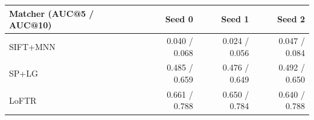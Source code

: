 \begin{tabular}{lrrr}
\toprule
Matcher (AUC@5 / AUC@10) & Seed 0 & Seed 1 & Seed 2 \\
\midrule
SIFT+MNN & 0.040 / 0.068 & 0.024 / 0.056 & 0.047 / 0.084 \\
SP+LG & 0.485 / 0.659 & 0.476 / 0.649 & 0.492 / 0.650 \\
LoFTR & 0.661 / 0.788 & 0.650 / 0.784 & 0.640 / 0.788 \\
\bottomrule
\end{tabular}